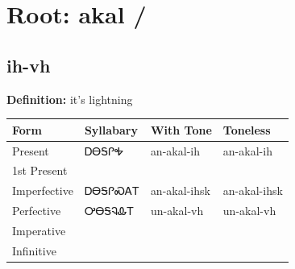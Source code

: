 \documentclass{article}%
\begin{document}
%
\normalsize%
\section*{Root: akal / }%
\subsection*{ih-vh}%
\textbf{Definition: }%
it’s lightning%
\\[0.5em]%
\begin{tabular}{|l|l|l|l|}%
\hline%
\textbf{Form}&\textbf{Syllabary}&\textbf{With Tone}&\textbf{Toneless}\\%
\hline%
Present&ᎠᎾᎦᎵᎭ&an{-}akal{-}ih&an{-}akal{-}ih\\%
1st Present&&&\\%
Imperfective&ᎠᎾᎦᎵᏍᎪᎢ&an{-}akal{-}ihsk&an{-}akal{-}ihsk\\%
Perfective&ᎤᎾᎦᎸᎲᎢ&un{-}akal{-}vh&un{-}akal{-}vh\\%
Imperative&&&\\%
Infinitive&&&\\%
\hline%
\end{tabular}%
\\[1em]%
\end{document}
